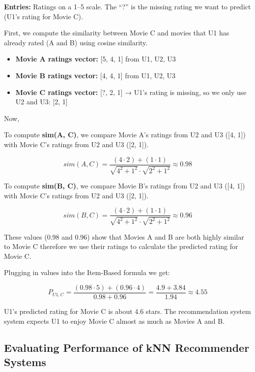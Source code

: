 \documentclass[
  12pt]{article}
\providecommand{\tightlist}{%
  \setlength{\itemsep}{0pt}\setlength{\parskip}{0pt}}
\begin{document}
\textbf{Entries:} Ratings on a 1--5 scale. The ``?'' is the missing
rating we want to predict (U1's rating for Movie C).

First, we compute the similarity between Movie C and movies that U1 has
already rated (A and B) using cosine similarity.

\begin{itemize}
\tightlist
\item
  \textbf{Movie A ratings vector:} {[}5, 4, 1{]} from U1, U2, U3\\
\item
  \textbf{Movie B ratings vector:} {[}4, 4, 1{]} from U1, U2, U3\\
\item
  \textbf{Movie C ratings vector:} {[}?, 2, 1{]} → U1's rating is
  missing, so we only use U2 and U3: {[}2, 1{]}
\end{itemize}

Now,

To compute \textbf{sim(A, C)}, we compare Movie A's ratings from U2 and
U3 ({[}4, 1{]}) with Movie C's ratings from U2 and U3 ({[}2, 1{]}).

\[
sim(A,C) = \frac{(4 \cdot 2) + (1 \cdot 1)}{\sqrt{4^2+1^2} \cdot \sqrt{2^2+1^2}} \approx 0.98
\]

To compute \textbf{sim(B, C)}, we compare Movie B's ratings from U2 and
U3 ({[}4, 1{]}) with Movie C's ratings from U2 and U3 ({[}2, 1{]}).

\[
sim(B,C) = \frac{(4 \cdot 2) + (1 \cdot 1)}{\sqrt{4^2+1^2} \cdot \sqrt{2^2+1^2}} \approx 0.96
\]

These values (0.98 and 0.96) show that Movies A and B are both highly
similar to Movie C therefore we use their ratings to calculate the
predicted rating for Movie C.

Plugging in values into the Item-Based formula we get:

\[
P_{U1,C} = \frac{(0.98 \cdot 5) + (0.96 \cdot 4)}{0.98 + 0.96} = \frac{4.9 + 3.84}{1.94} \approx 4.55
\]

U1's predicted rating for Movie C is about 4.6 stars. The recommendation
system system expects U1 to enjoy Movie C almost as much as Movies A and
B.

\subsection{\texorpdfstring{\textbf{Evaluating Performance of kNN
Recommender
Systems}}{Evaluating Performance of kNN Recommender Systems}}\label{evaluating-performance-of-knn-recommender-systems}
\end{document}
